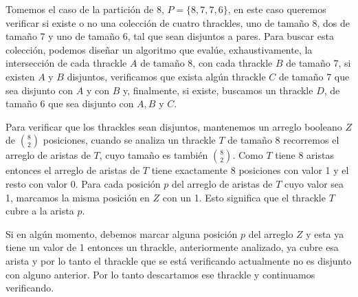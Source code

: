   \begin{algorithm}
    \LinesNumbered
    \setcounter{AlgoLine}{35}
  \end{algorithm}
  Tomemos el caso de la partición de $8$, $P=\{8,7,7,6\}$, en este caso queremos
  verificar si existe o no una colección de cuatro thrackles, uno de tamaño 8, dos de
  tamaño 7 y uno de tamaño 6, tal que sean disjuntos a pares. Para buscar esta colección,
  podemos diseñar un algoritmo que evalúe, exhaustivamente, la intersección de cada
  thrackle $A$ de tamaño 8, con cada thrackle $B$ de tamaño 7, si existen $A$ y $B$
  disjuntos, verificamos que exista algún thrackle $C$ de tamaño 7 que sea disjunto con
  $A$ y con $B$ y, finalmente, si existe, buscamos un thrackle $D$, de tamaño 6 que sea
  disjunto con $A,B$ y $C$.

  Para verificar que los thrackles sean disjuntos, mantenemos un arreglo booleano $Z$ de $\binom{8}{2}$ posiciones, cuando se analiza un thrackle $T$ de tamaño 8 recorremos el arreglo de aristas de $T$, cuyo tamaño es también $\binom{8}{2}$. Como $T$ tiene 8 aristas entonces el arreglo de aristas de $T$ tiene exactamente 8 posiciones con valor 1
  y el resto con valor 0. Para cada posición $p$ del arreglo de aristas de $T$ cuyo valor sea 1, marcamos la misma posición en $Z$ con un 1. Esto significa que el thrackle $T$ cubre a la arista $p$.

  Si en algún momento, debemos marcar alguna posición $p$ del arreglo $Z$ y esta ya tiene un valor de 1 entonces un thrackle, anteriormente analizado, ya cubre esa arista y por lo tanto el thrackle que se está verificando actualmente no es disjunto con alguno anterior. Por lo tanto descartamos ese thrackle y continuamos verificando.

